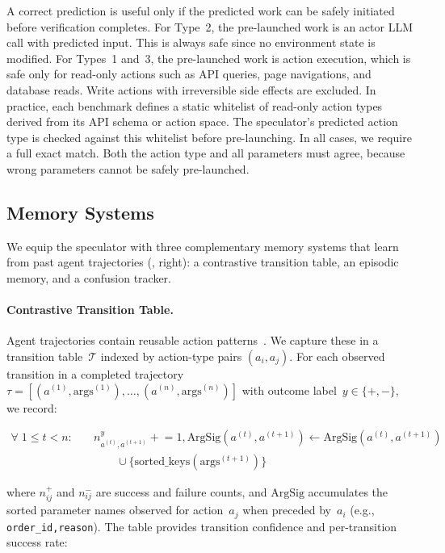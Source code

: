 \documentclass{article}
\begin{document}


A correct prediction is useful only if the predicted work can be safely initiated before verification completes. For Type~2, the pre-launched work is an actor LLM call with predicted input. This is always safe since no environment state is modified. For Types~1 and~3, the pre-launched work is action execution, which is safe only for read-only actions such as API queries, page navigations, and database reads. Write actions with irreversible side effects are excluded. In practice, each benchmark defines a static whitelist of read-only action types derived from its API schema or action space. The speculator's predicted action type is checked against this whitelist before pre-launching. In all cases, we require a full exact match. Both the action type and all parameters must agree, because wrong parameters cannot be safely pre-launched.

\subsection{Memory Systems}
\label{sec:method:memory}
We equip the speculator with three complementary memory systems that learn from past agent trajectories (, right): a contrastive transition table, an episodic memory, and a confusion tracker.

\paragraph{Contrastive Transition Table.}
Agent trajectories contain reusable action patterns~\citep{wang2024awm,fang2025memp,wang2023voyager}. We capture these in a transition table~$\mathcal{T}$ indexed by action-type pairs $(a_i, a_j)$. For each observed transition in a completed trajectory $\tau = [(a^{(1)}, \text{args}^{(1)}), \ldots, (a^{(n)}, \text{args}^{(n)})]$ with outcome label~$y \in \{+, -\}$, we record:

\begin{equation}
\begin{split}
    \forall\; 1 \le t < n: \quad
    & n^{y}_{a^{(t)}, a^{(t+1)}} \mathrel{+}= 1,
    \text{ArgSig}(a^{(t)}, a^{(t+1)}) \mathrel{\leftarrow} \text{ArgSig}(a^{(t)}, a^{(t+1)}) \\
    & \qquad \cup \{\text{sorted\_keys}(\text{args}^{(t+1)})\}
\end{split}
\end{equation}

where $n^{+}_{ij}$ and $n^{-}_{ij}$ are success and failure counts, and $\text{ArgSig}$ accumulates the sorted parameter names observed for action~$a_j$ when preceded by~$a_i$ (e.g., \texttt{order\_id,reason}). The table provides transition confidence and per-transition success rate:
\end{document}
